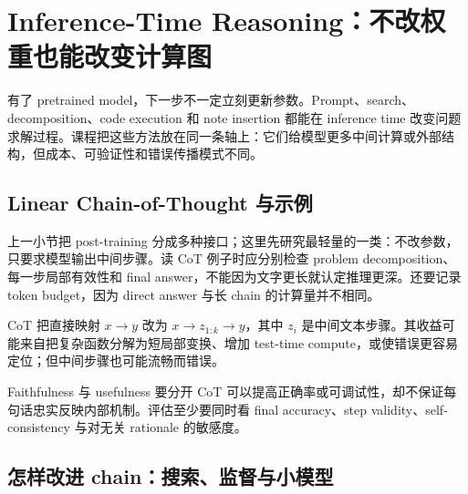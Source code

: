 \section{Inference-Time Reasoning：不改权重也能改变计算图}

有了 pretrained model，下一步不一定立刻更新参数。Prompt、search、decomposition、code execution 和 note insertion 都能在 inference time 改变问题求解过程。课程把这些方法放在同一条轴上：它们给模型更多中间计算或外部结构，但成本、可验证性和错误传播模式不同。




\subsection{Linear Chain-of-Thought 与示例}

上一小节把 post-training 分成多种接口；这里先研究最轻量的一类：不改参数，只要求模型输出中间步骤。读 CoT 例子时应分别检查 problem decomposition、每一步局部有效性和 final answer，不能因为文字更长就认定推理更深。还要记录 token budget，因为 direct answer 与长 chain 的计算量并不相同。

CoT 把直接映射 $x\rightarrow y$ 改为 $x\rightarrow z_{1:k}\rightarrow y$，其中 $z_i$ 是中间文本步骤。其收益可能来自把复杂函数分解为短局部变换、增加 test-time compute，或使错误更容易定位；但中间步骤也可能流畅而错误。





\begin{warningbox}{Faithfulness 与 usefulness 要分开}
CoT 可以提高正确率或可调试性，却不保证每句话忠实反映内部机制。评估至少要同时看 final accuracy、step validity、self-consistency 与对无关 rationale 的敏感度。
\end{warningbox}

\subsection{怎样改进 chain：搜索、监督与小模型}

